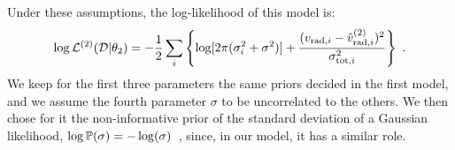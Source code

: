 \noindent
Under these assumptions, the log-likelihood of this model is:
\begin{equation}\label{Eq:LogLikeMod2}
    \log \mathbb{\mathcal{L}}^{(2)}(\mathcal{D} \vert \theta_2) = -\frac{1}{2}\sum_i\left\{\log[2\pi(\sigma_{i}^2+\sigma^2)]+\frac{(v_{\text{rad},i} - \hat{v}_{\text{rad},i}^{(2)})^2}{\sigma_{\text{tot}, i}^2}\right\} \text{ .}
\end{equation}
\noindent
We keep for the first three parameters the same priors decided in the first model, and we assume the fourth parameter $\sigma$ to be uncorrelated to the others. %
We then chose for it the non-informative prior of the standard deviation of a Gaussian likelihood, $\log \mathbb{P} (\sigma) = - \log(\sigma)$~\cite{mackay2003}, since, in our model, it has a similar role.
